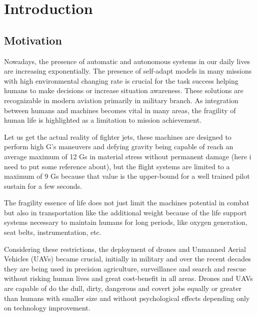 \chapter{Introduction} %

\section{Motivation}
\label{sec:motivation}

Nowadays, the presence of automatic and autonomous systems in our daily lives are increasing exponentially. The presence of self-adapt models in many missions with high environmental changing rate is crucial for the task success helping humans to make decisions or increase situation awareness. These solutions are recognizable in modern aviation primarily in military branch. As integration between humans and machines becomes vital in many areas, the fragility of human life is highlighted as a limitation to mission achievement.

Let us get the actual reality of fighter jets, these machines are designed to perform high G's maneuvers and defying gravity being capable of reach an average maximum of 12 Gs in material stress without permanent damage (here i need to put some reference about), but the flight systems are limited to a maximum of 9 Gs because that value is the upper-bound for a well trained pilot sustain for a few seconds. \cite{WHINNERY2013}

The fragility essence of life does not just limit the machines potential in combat but also in transportation like the additional weight because of the life support systems necessary to maintain humans for long periods, like oxygen generation, seat belts, instrumentation, etc.

Considering these restrictions, the deployment of drones and Unmanned Aerial Vehicles (UAVs) became crucial, initially in military and over the recent decades they are being used in precision agriculture, surveillance and search and rescue without risking human lives and great cost-benefit in all areas. Drones and UAVs are capable of do the dull, dirty, dangerous and covert jobs equally or greater than humans with smaller size and without psychological effects depending only on technology improvement. \cite{AUSTINUAS2010}
 
